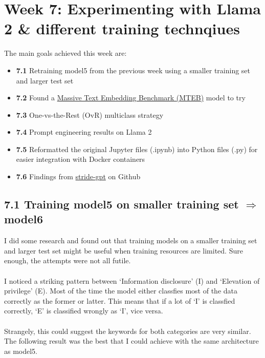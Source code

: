 \section*{Week 7: Experimenting with Llama 2 \& different training technqiues}

The main goals achieved this week are:
\begin{itemize}[topsep=0pt]
    \item \textbf{7.1} Retraining model5 from the previous week using a smaller training set and larger test set
    \item \textbf{7.2} Found a \href{https://arxiv.org/pdf/2210.07316.pdf}{Massive Text Embedding Benchmark (MTEB)} model to try
    \item \textbf{7.3} One-vs-the-Rest (OvR) multiclass strategy
    \item \textbf{7.4} Prompt engineering results on Llama 2
    \item \textbf{7.5} Reformatted the original Jupyter files (.ipynb) into Python files (.py) for easier integration with Docker containers
    \item \textbf{7.6} Findings from \href{https://github.com/mrwadams/stride-gpt?tab=readme-ov-file#usage}{stride-gpt} on Github
\end{itemize}

\subsection*{7.1 Training model5 on smaller training set $\Longrightarrow$ model6}
I did some research and found out that training models on a smaller training set and larger test set might be useful when training resources are limited.
Sure enough, the attempts were not all futile. \\\\
I noticed a striking pattern between `Information disclosure' (I) and `Elevation of privilege' (E). Most of the time the model either classfies most of the data correctly as the former or latter. This means that if a lot of `I' is classfied correctly, `E' is classified wrongly as `I', vice versa. \\\\
Strangely, this could suggest the keywords for both categories are very similar. The following result was the best that I could achieve with the same architecture as model5. \\

